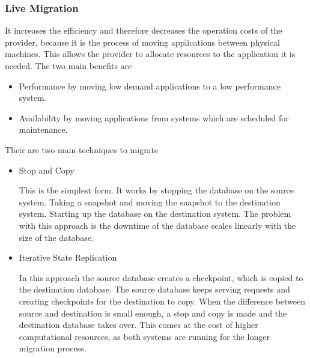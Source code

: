 \subsubsection{Live Migration}
\cite{sakr2014cloud}
It increases the efficiency and therefore decreases the operation costs of the provider, because it is the process of moving applications between physical machines. This allows the provider to allocate resources to the application it is needed. The two main benefits are
\begin{itemize}
    \item Performance by moving low demand applications to a low performance system.
    \item Availability by moving applications from systems which are scheduled for maintenance.
\end{itemize}

Their are two main techniques to migrate \cite{sakr2014cloud}
\begin{itemize}
    \item Stop and Copy
    
    This is the simplest form. It works by stopping the database on the source system. Taking a snapshot and moving the snapshot to the destination system. Starting up the database on the destination system. The problem with this approach is the downtime of the database scales linearly with the size of the database.
    
    \item Iterative State Replication
    
    In this approach the source database creates a checkpoint, which is copied to the destination database. The source database keeps serving requests and creating checkpoints for the destination to copy. When the difference between source and destination is small enough, a stop and copy is made and the destination database takes over. This comes at the cost of higher computational resources, as both systems are running for the longer migration process. 
\end{itemize}

